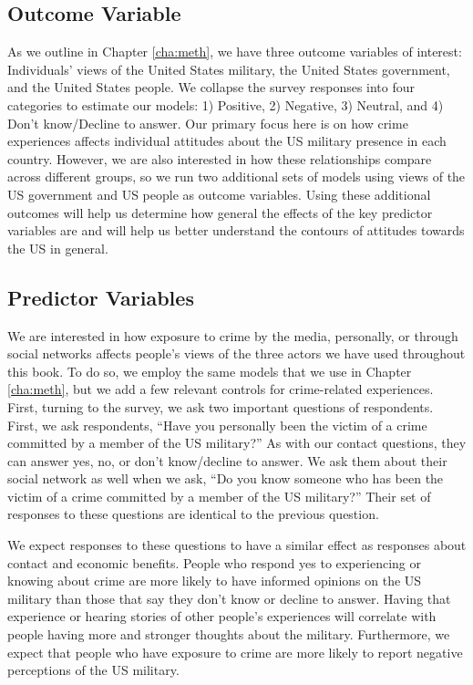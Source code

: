 
\subsection*{Outcome Variable}
As we outline in Chapter \ref{cha:meth}, we have three outcome variables of interest: Individuals' views of the United States military, the United States government, and the United States people. We collapse the survey responses into four categories to estimate our models: 1) Positive, 2) Negative, 3) Neutral, and 4) Don't know/Decline to answer. Our primary focus here is on how crime experiences affects individual attitudes about the US military presence in each country. However, we are also interested in how these relationships compare across different groups, so we run two additional sets of models using views of the US government and US people as outcome variables. Using these additional outcomes will help us determine how general the effects of the key predictor variables are and will help us better understand the contours of attitudes towards the US in general. 

\subsection*{Predictor Variables}

We are interested in how exposure to crime by the media, personally, or through social networks affects people's views of the three actors we have used throughout this book. To do so, we employ the same models that we use in Chapter \ref{cha:meth}, but we add a few relevant controls for crime-related experiences. First, turning to the survey, we ask two important questions of respondents. First, we ask respondents, ``Have you personally been the victim of a crime committed by a member of the US military?'' As with our contact questions, they can answer yes, no, or don't know/decline to answer. We ask them about their social network as well when we ask, ``Do you know someone who has been the victim of a crime committed by a member of the US military?'' Their set of responses to these questions are identical to the previous question.

We expect responses to these questions to have a similar effect as responses about contact and economic benefits. People who respond yes to experiencing or knowing about crime are more likely to have informed opinions on the US military than those that say they don't know or decline to answer. Having that experience or hearing stories of other people's experiences will correlate with people having more and stronger thoughts about the military. Furthermore, we expect that people who have exposure to crime are more likely to report negative perceptions of the US military. 

